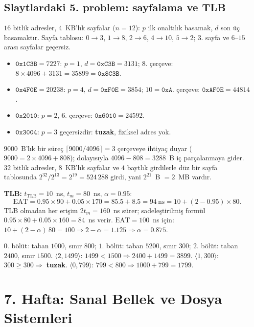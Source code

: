 \subsection{Slaytlardaki 5. problem: sayfalama ve TLB}
$16$ bitlik adresler, $4$~KB'lık sayfalar ($n = 12$): $p$ ilk onaltılık basamak, $d$ son üç basamaktır. Sayfa tablosu: $0\to3$, $1\to8$, $2\to6$, $4\to10$, $5\to2$; $3$. sayfa ve $6$--$15$ arası sayfalar geçersiz.
\begin{itemize}
  \item $\texttt{0x1C3B} = 7227$: $p = 1$, $d = \texttt{0xC3B} = 3131$; $8$. çerçeve: $8 \times 4096 + 3131 = 35899 = \texttt{0x8C3B}$.
  \item $\texttt{0x4F0E} = 20238$: $p = 4$, $d = \texttt{0xF0E} = 3854$; $10 = \texttt{0xA}$. çerçeve: $\texttt{0xAF0E} = 44814$.
  \item $\texttt{0x2010}$: $p = 2$, $6$. çerçeve: $\texttt{0x6010} = 24592$.
  \item $\texttt{0x3004}$: $p = 3$ geçersizdir: \textbf{tuzak}, fiziksel adres yok.
\end{itemize}
$9000$~B'lık bir süreç $\lceil 9000/4096\rceil = 3$ çerçeveye ihtiyaç duyar ($9000 = 2\times4096 + 808$); dolayısıyla $4096 - 808 = 3288$~B iç parçalanmaya gider. $32$ bitlik adresler, $8$~KB'lık sayfalar ve $4$ baytlık girdilerle düz bir sayfa tablosunda $2^{32}/2^{13} = 2^{19} = 524\,288$ girdi, yani $2^{21}$~B $= 2$~MB vardır.

\textbf{TLB:} $t_{\text{TLB}} = 10$~ns, $t_m = 80$~ns, $\alpha = 0.95$:
\[
\text{EAT} = 0.95 \times 90 + 0.05 \times 170 = 85.5 + 8.5 = 94\ \text{ns} = 10 + (2 - 0.95)\times 80 .
\]
TLB olmadan her erişim $2t_m = 160$~ns sürer; sadeleştirilmiş formül $0.95\times80 + 0.05\times160 = 84$~ns verir. $\text{EAT} = 100$~ns için: $10 + (2-\alpha)\,80 = 100 \Rightarrow 2 - \alpha = 1.125 \Rightarrow \alpha = 0.875$.

\begin{example}
$0$. bölüt: taban $1000$, sınır $800$; $1$. bölüt: taban $5200$, sınır $300$; $2$. bölüt: taban $2400$, sınır $1500$.
$\langle 2, 1499\rangle$: $1499 < 1500 \Rightarrow 2400 + 1499 = 3899$.
$\langle 1, 300\rangle$: $300 \ge 300 \Rightarrow$ \textbf{tuzak}.
$\langle 0, 799\rangle$: $799 < 800 \Rightarrow 1000 + 799 = 1799$.
\end{example}

\section{7. Hafta: Sanal Bellek ve Dosya Sistemleri}
\label{sec:w7}
